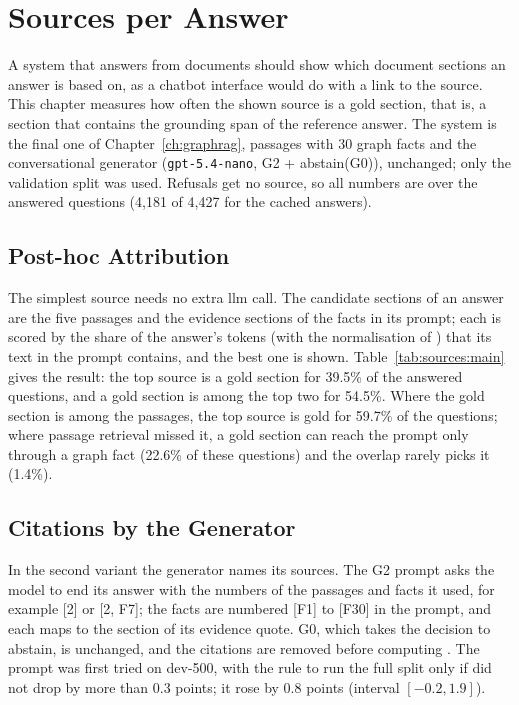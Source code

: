 
\chapter{Sources per Answer}\label{ch:sources}

A system that answers from documents should show which document sections an answer is based
on, as a chatbot interface would do with a link to the source. This chapter measures how often
the shown source is a gold section, that is, a section that contains the grounding span of the
reference answer. The system is the final one of Chapter~\ref{ch:graphrag}, passages with 30
graph facts and the conversational generator (\texttt{gpt-5.4-nano}, G2 + abstain(G0)),
unchanged; only the validation split was used. Refusals get no source, so all numbers are over
the answered questions (4{,}181 of 4{,}427 for the cached answers).


\section{Post-hoc Attribution}\label{sec:sources:posthoc}

The simplest source needs no extra \gls{llm} call. The candidate sections of an answer are the
five passages and the evidence sections of the facts in its prompt; each is scored by the share
of the answer's tokens (with the normalisation of \fone{}) that its text in the prompt contains,
and the best one is shown. Table~\ref{tab:sources:main} gives the result: the top source is a
gold section for 39.5\% of the answered questions, and a gold section is among the top two for
54.5\%. Where the gold section is among the passages, the top source is gold for 59.7\% of the
questions; where passage retrieval missed it, a gold section can reach the prompt only through a
graph fact (22.6\% of these questions) and the overlap rarely picks it (1.4\%).


\section{Citations by the Generator}\label{sec:sources:cite}

In the second variant the generator names its sources. The G2 prompt asks the model to end its
answer with the numbers of the passages and facts it used, for example [2] or [2, F7]; the facts
are numbered [F1] to [F30] in the prompt, and each maps to the section of its evidence quote.
G0, which takes the decision to abstain, is unchanged, and the citations are removed before
computing \fone{}. The prompt was first tried on dev-500, with the rule to run the full split only
if \fone{} did not drop by more than 0.3 points; it rose by 0.8 points (interval $[-0.2, 1.9]$).

